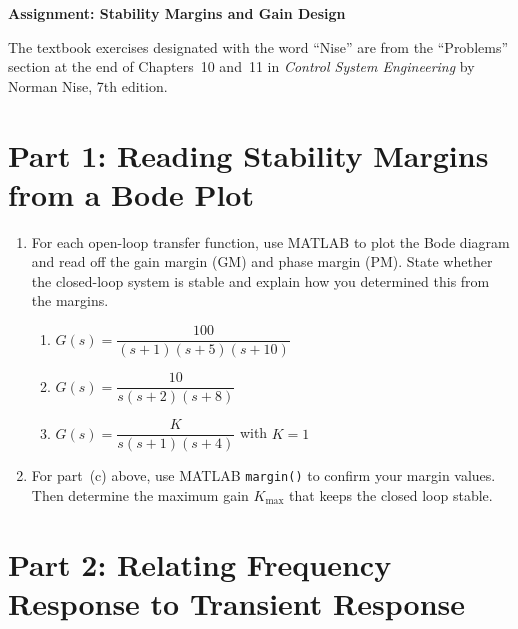 \documentclass[11pt]{article}
\begin{document}
\begin{center}
  \Large{\bf{Assignment: Stability Margins and Gain Design}}
\end{center}

The textbook exercises designated with the word ``Nise'' are from the
``Problems'' section at the end of Chapters~10 and~11 in \emph{Control System
Engineering} by Norman Nise, 7th edition.

\section*{Part 1: Reading Stability Margins from a Bode Plot}

\begin{enumerate}

\item For each open-loop transfer function, use MATLAB to plot the Bode diagram
  and read off the gain margin (GM) and phase margin (PM).  State whether
  the closed-loop system is stable and explain how you determined this from
  the margins.

  \begin{enumerate}
    \item $G(s) = \dfrac{100}{(s+1)(s+5)(s+10)}$
    \item $G(s) = \dfrac{10}{s(s+2)(s+8)}$
    \item $G(s) = \dfrac{K}{s(s+1)(s+4)}$ with $K = 1$
  \end{enumerate}

\item For part~(c) above, use MATLAB \texttt{margin()} to confirm your
  margin values.  Then determine the maximum gain $K_{\max}$ that keeps the
  closed loop stable.

\end{enumerate}

\section*{Part 2: Relating Frequency Response to Transient Response}
\end{document}
